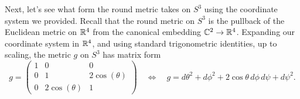 \documentclass{../../templates/lkx_pset}
\begin{document}
\begin{parts}
	Next, let's see what form the round metric takes on $S^3$ using the coordinate system we provided. Recall that the round metric on $S^3$ is the pullback of the Euclidean metric on $\mathbb{R}^4$ from the canonical embedding $\mathbb{C}^2\to \mathbb{R}^4$. Expanding our coordinate system in $\mathbb{R}^4$, and
	using standard trigonometric identities, up to scaling, the metric $g$ on $S^3$ has matrix form
	\[
		g = 
		\begin{pmatrix} 1 & 0             & 0             \\
                0 & 1             & 2\cos(\theta) \\
                0 & 2\cos(\theta) & 1\end{pmatrix}\quad\iff\quad
		g = d\theta^2 + d\phi^2+ 2\cos\theta \,d\phi\, d\psi + d\psi^2.
	\]


\end{parts}
\end{document}
